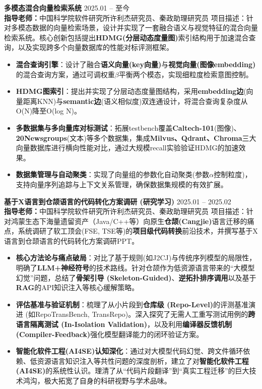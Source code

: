 \documentclass[11pt]{article}
\newlength{\interProjectSpacing}
\newcommand{\projectsep}{\vspace{\interProjectSpacing}}
\newlength{\intraProjectTitleSep}
\newcommand{\titlebreak}{\\[\intraProjectTitleSep]}
\newlength{\intraProjectListTopSep}
\begin{document}
    \textbf{多模态混合向量检索系统} \hfill 2025.01 -- 至今 \titlebreak
    \textbf{指导老师：}中国科学院软件研究所许利杰研究员、秦政助理研究员
    项目描述：针对多模态数据的向量检索场景，设计并实现了一套融合语义与视觉特征的混合向量检索系统。核心创新包括提出\textbf{HDMG(分层动态度量图)}索引结构用于加速混合查询，以及实现跨多个向量数据库的性能对标评测框架。
    \begin{itemize}[nosep, topsep=\intraProjectListTopSep]
        \item \textbf{混合查询引擎}：设计了融合\textbf{语义向量(key向量)}与\textbf{视觉向量(图像embedding)}的混合查询方案，通过可调权重$\beta$平衡两个模态，实现细粒度检索意图控制。
        \item \textbf{HDMG图索引}：提出并实现了分层动态度量图结构，采用\textbf{embedding边}(向量距离KNN)与\textbf{semantic边}(语义相似度)双连通设计，将混合查询复杂度从O(N)降至O(log N)。
        \item \textbf{多数据集与多向量库对标测试}：拓展testbench覆盖\textbf{Caltech-101}(图像)、\textbf{20Newsgroups}(文本)等多个数据集，集成\textbf{Milvus、Qdrant、Chroma}三大向量数据库进行横向性能对比，通过大规模recall实验验证HDMG的加速效果。
        \item \textbf{数据集管理与自动聚类}：实现了向量组的参数化自动聚类(参数$\alpha$控制粒度)，支持向量序列追踪与上下文关系管理，确保数据集规模的有效扩展。
    \end{itemize}
    \projectsep

    \textbf{基于X语言到仓颉语言的代码转化方案调研 (研究学习)} \hfill 2025.01 -- 2025.02 \titlebreak
    \textbf{指导老师：}中国科学院软件研究所许利杰研究员、秦政助理研究员
    项目描述：针对鸿蒙生态下海量遗留资产（Java/C++等）向原生\textbf{仓颉(Cangjie)}语言迁移的痛点，系统调研了软工顶会(FSE, TSE等)的\textbf{项目级代码转换}前沿技术，并撰写基于X语言到仓颉语言的代码转化方案调研PPT。
    \begin{itemize}
        \item \textbf{核心方法论与痛点破局}：对比了基于规则(如J2CJ)与传统序列模型的局限性，明确了\textbf{LLM+神经符号}的技术路线。针对仓颉作为低资源语言带来的“大模型幻觉”问题，总结了\textbf{骨架引导 (Skeleton-Guided)}、\textbf{逆拓扑排序调用}以及基于\textbf{RAG}的API知识注入等核心缓解策略。
        \item \textbf{评估基准与验证机制}：梳理了从小片段到\textbf{仓库级 (Repo-Level)}的评测基准演进 (如RepoTransBench, TransRepo)。深入探究了无需人工重写测试用例的\textbf{跨语言隔离测试 (In-Isolation Validation)}，以及利用\textbf{编译器反馈机制 (Compiler-Feedback)}强化模型翻译能力的闭环验证方案。
        \item \textbf{智能化软件工程(AI4SE)认知深化}：通过对大模型代码幻觉、跨文件循环依赖、低资源语言知识注入等共性问题的深度剖析，建立了对\textbf{智能化软件工程 (AI4SE)}的系统性认识。理清了从“代码片段翻译”到“真实工程迁移”的巨大技术鸿沟，极大拓宽了自身的科研视野与学术品味。
    \end{itemize}
    \projectsep
\end{document}
